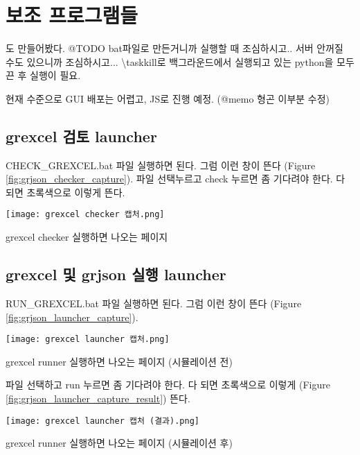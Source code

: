 
\section{보조 프로그램들}
도 만들어봤다. @TODO
bat파일로 만든거니까 실행할 때 조심하시고.. 서버 안꺼질 수도 있으니까 조심하시고... \textbackslash taskkill로 백그라운드에서 실행되고 있는 python을 모두 끈 후 실행이 필요. \par
현재 수준으로 GUI 배포는 어렵고, JS로 진행 예정.  (@memo 형곤 이부분 수정)

\subsection{grexcel 검토 launcher}
CHECK\_GREXCEL.bat 파일 실행하면 된다. 그럼 이런 창이 뜬다 (Figure \ref{fig:grjson_checker_capture}).
파일 선택누르고 check 누르면 좀 기다려야 한다. 다 되면 초록색으로 이렇게 뜬다.

\begin{defaultfigure}
  \texttt{[image: grexcel checker 캡처.png]}
  \caption{grexcel checker 실행하면 나오는 페이지}
  \label{fig:grjson_checker_capture}
\end{defaultfigure}

\subsection{grexcel 및 grjson 실행 launcher}
RUN\_GREXCEL.bat 파일 실행하면 된다. 그럼 이런 창이 뜬다 (Figure \ref{fig:grjson_launcher_capture}).

\begin{defaultfigure}
  \texttt{[image: grexcel launcher 캡처.png]}
  \caption{grexcel runner 실행하면 나오는 페이지 (시뮬레이션 전)}
  \label{fig:grjson_launcher_capture}
\end{defaultfigure}

파일 선택하고 run 누르면 좀 기다려야 한다. 다 되면 초록색으로 이렇게 (Figure \ref{fig:grjson_launcher_capture_result}) 뜬다.

\begin{defaultfigure}
  \texttt{[image: grexcel launcher 캡처 (결과).png]}
  \caption{grexcel runner 실행하면 나오는 페이지 (시뮬레이션 후)}
  \label{fig:grjson_launcher_capture_result}
\end{defaultfigure}


